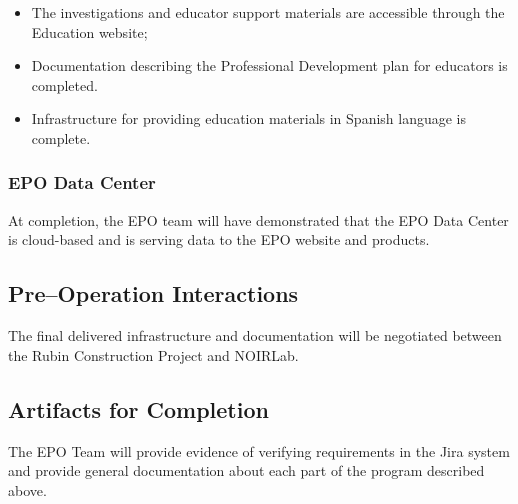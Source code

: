 \begin{itemize}
	\item The investigations and educator support materials are accessible through the Education website;
	\item Documentation describing the Professional Development plan for educators is completed.
	\item Infrastructure for providing education materials in Spanish language is complete.
\end{itemize}

\subsubsection{EPO Data Center}

At completion, the EPO team will have demonstrated that the EPO Data Center is cloud-based and is serving data to the EPO website and products.

\subsection{Pre--Operation Interactions}

The final delivered infrastructure and documentation will be negotiated between the Rubin Construction Project and NOIRLab.

\subsection{Artifacts for Completion}

The EPO Team will provide evidence of verifying requirements in the Jira system and provide general documentation about each part of the program described above.


